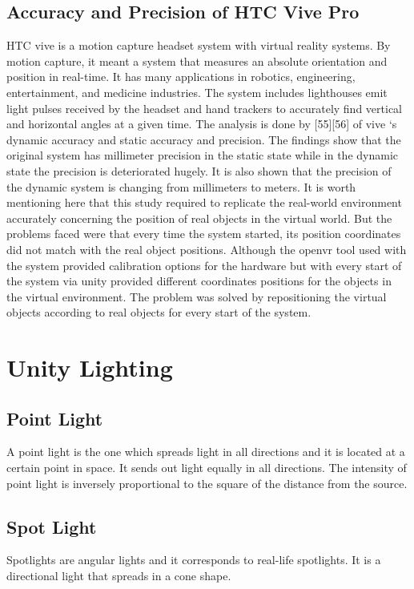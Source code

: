 \subsection{Accuracy and Precision of HTC Vive Pro}
HTC vive is a motion capture headset system with virtual reality systems. By motion capture, it meant a system that measures an absolute orientation and position in real-time. It has many applications in robotics, engineering, entertainment, and medicine industries. The system includes lighthouses emit light pulses received by the headset and hand trackers to accurately find vertical and horizontal angles at a given time. The analysis is done by [55][56] of vive ‘s dynamic accuracy and static accuracy and precision. The findings show that the original system has millimeter precision in the static state while in the dynamic state the precision is deteriorated hugely. It is also shown that the precision of the dynamic system is changing from millimeters to meters.  It is worth mentioning here that this study required to replicate the real-world environment accurately concerning the position of real objects in the virtual world. But the problems faced were that every time the system started, its position coordinates did not match with the real object positions. Although the openvr tool used with the system provided calibration options for the hardware but with every start of the system via unity provided different coordinates positions for the objects in the virtual environment. The problem was solved by repositioning the virtual objects according to real objects for every start of the system.    

\section{Unity Lighting}
\subsection{Point Light}
A point light is the one which spreads light in all directions and it is located at a certain point in space. It sends out light equally in all directions. The intensity of point light is inversely proportional to the square of the distance from the source.

\subsection{Spot Light}
Spotlights are angular lights and it corresponds to real-life spotlights. It is a directional light that spreads in a cone shape.

